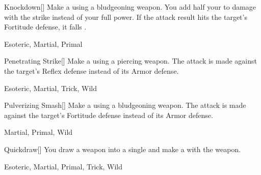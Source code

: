 \lowercase{\hypertarget{maneuver:Knockdown}{}}\label{maneuver:Knockdown}
\hypertarget{maneuver:Knockdown}{}
\begin{freeability}[Rank 1]{Knockdown}[]
Make a  using a bludgeoning weapon.
You add half your  to damage with the strike instead of your full power.
If the attack result hits the target's Fortitude defense,
it falls .


 Esoteric, Martial, Primal
\end{freeability}
\vspace{0.25em}



\lowercase{\hypertarget{maneuver:Penetrating Strike}{}}\label{maneuver:Penetrating Strike}
\hypertarget{maneuver:Penetrating Strike}{}
\begin{freeability}[Rank 1]{Penetrating Strike}[]
Make a  using a piercing weapon.
The attack is made against the target's Reflex defense instead of its Armor defense.


 Esoteric, Martial, Trick, Wild
\end{freeability}
\vspace{0.25em}



\lowercase{\hypertarget{maneuver:Pulverizing Smash}{}}\label{maneuver:Pulverizing Smash}
\hypertarget{maneuver:Pulverizing Smash}{}
\begin{freeability}[Rank 1]{Pulverizing Smash}[]
Make a  using a bludgeoning weapon.
The attack is made against the target's Fortitude defense instead of its Armor defense.


 Martial, Primal, Wild
\end{freeability}
\vspace{0.25em}



\lowercase{\hypertarget{maneuver:Quickdraw}{}}\label{maneuver:Quickdraw}
\hypertarget{maneuver:Quickdraw}{}
\begin{freeability}[Rank 1]{Quickdraw}[]
You draw a weapon into a single  and make a  with the weapon.


 Esoteric, Martial, Primal, Trick, Wild
\end{freeability}
\vspace{0.25em}



